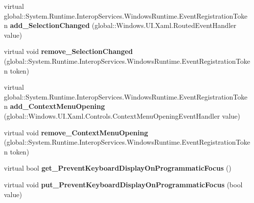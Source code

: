 \begin{DoxyCompactItemize}
\item 
\mbox{\label{class_windows_1_1_u_i_1_1_xaml_1_1_controls_1_1_text_box_aa7a814e90af6bc70d3d39b87e1dcc130}} 
virtual global\+::\+System.\+Runtime.\+Interop\+Services.\+Windows\+Runtime.\+Event\+Registration\+Token {\bfseries add\+\_\+\+Selection\+Changed} (global\+::\+Windows.\+U\+I.\+Xaml.\+Routed\+Event\+Handler value)
\item 
\mbox{\label{class_windows_1_1_u_i_1_1_xaml_1_1_controls_1_1_text_box_ab695fdfc9633cf4e369d19dceb2d3327}} 
virtual void {\bfseries remove\+\_\+\+Selection\+Changed} (global\+::\+System.\+Runtime.\+Interop\+Services.\+Windows\+Runtime.\+Event\+Registration\+Token token)
\item 
\mbox{\label{class_windows_1_1_u_i_1_1_xaml_1_1_controls_1_1_text_box_ab836344ac1b9e4cb88bf838f48407e7c}} 
virtual global\+::\+System.\+Runtime.\+Interop\+Services.\+Windows\+Runtime.\+Event\+Registration\+Token {\bfseries add\+\_\+\+Context\+Menu\+Opening} (global\+::\+Windows.\+U\+I.\+Xaml.\+Controls.\+Context\+Menu\+Opening\+Event\+Handler value)
\item 
\mbox{\label{class_windows_1_1_u_i_1_1_xaml_1_1_controls_1_1_text_box_ad3a3c299db3a774e1db87983c4ee1b5c}} 
virtual void {\bfseries remove\+\_\+\+Context\+Menu\+Opening} (global\+::\+System.\+Runtime.\+Interop\+Services.\+Windows\+Runtime.\+Event\+Registration\+Token token)
\item 
\mbox{\label{class_windows_1_1_u_i_1_1_xaml_1_1_controls_1_1_text_box_ab8c87aab30bc9eb47b16617cd979f283}} 
virtual bool {\bfseries get\+\_\+\+Prevent\+Keyboard\+Display\+On\+Programmatic\+Focus} ()
\item 
\mbox{\label{class_windows_1_1_u_i_1_1_xaml_1_1_controls_1_1_text_box_aeb5452275c88b059cb6fcab37f2c0547}} 
virtual void {\bfseries put\+\_\+\+Prevent\+Keyboard\+Display\+On\+Programmatic\+Focus} (bool value)
\item 
\mbox{\label{class_windows_1_1_u_i_1_1_xaml_1_1_controls_1_1_text_box_a228a83caf2e3f6ac77d710ba279dfb6e}} 

\end{DoxyCompactItemize}
